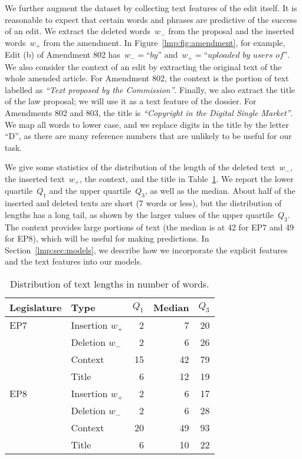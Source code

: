 We further augment the dataset by collecting text features of the edit itself.
It is reasonable to expect that certain words and phrases are predictive of the success of an edit.
We extract the deleted words~$w_-$ from the proposal and the inserted words~$w_+$ from  the amendment.
In Figure~\ref{lmp:fig:amendment}, for example, Edit (b) of Amendment 802 has~$w_- = \textit{``by''}$ and~$w_+ = \textit{``uploaded by users of''}$.
We also consider the context of an edit by extracting the original text of the whole amended article.
For Amendment 802, the context is the portion of text labelled as \textit{``Text proposed by the Commission''}.
Finally, we also extract the title of the law proposal; we will use it as a text feature of the dossier.
For Amendments 802 and 803, the title is \textit{``Copyright in the Digital Single Market''}.
We map all words to lower case, and we replace digits in the title by the letter ``D'', as there are many reference numbers that are unlikely to be useful for our task.

We give some statistics of the distribution of the length of the deleted text~$w_-$, the inserted text~$w_+$, the context, and the title in Table~\ref{lmp:tab:text}.
We report the lower quartile~$Q_1$ and the upper quartile~$Q_3$, as well as the median.
About half of the inserted and deleted texts are short (7 words or less), but the distribution of lengths has a long tail, as shown by the larger values of the upper quartile~$Q_3$.
The context provides large portions of text (the median is at 42 for EP7 and 49 for EP8), which will be useful for making predictions.
In Section~\ref{lmp:sec:models}, we describe how we incorporate the explicit features and the text features into our models.

\begin{table}
  \centering
	\caption{Distribution of text lengths in number of words.}
	\label{lmp:tab:text}
	\begin{tabular}{llrrr}
		\toprule
		Legislature & Type            & $Q_1$ & Median & $Q_3$ \\
		\midrule
		EP7         & Insertion $w_+$ & 2     & 7      & 20    \\
		            & Deletion $w_-$  & 2     & 6      & 26    \\
		            & Context         & 15    & 42     & 79    \\
		            & Title           & 6     & 12     & 19    \\
		EP8         & Insertion $w_+$ & 2     & 6      & 17    \\
		            & Deletion $w_-$  & 2     & 6      & 28    \\
		            & Context         & 20    & 49     & 93    \\
		            & Title           & 6     & 10     & 22    \\
		\bottomrule
	\end{tabular}
\end{table}

